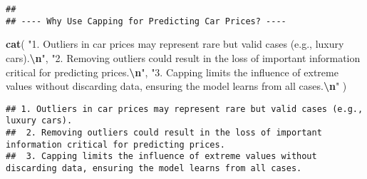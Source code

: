 \documentclass[
]{article}
\newenvironment{Shaded}{\begin{snugshade}}{\end{snugshade}}
\newcommand{\FunctionTok}[1]{\textcolor[rgb]{0.13,0.29,0.53}{\textbf{#1}}}
\newcommand{\NormalTok}[1]{#1}
\newcommand{\SpecialCharTok}[1]{\textcolor[rgb]{0.81,0.36,0.00}{\textbf{#1}}}
\newcommand{\StringTok}[1]{\textcolor[rgb]{0.31,0.60,0.02}{#1}}
\begin{document}
\begin{verbatim}
## 
## ---- Why Use Capping for Predicting Car Prices? ----
\end{verbatim}

\begin{Shaded}
\begin{Highlighting}[]
\FunctionTok{cat}\NormalTok{(}
  \StringTok{"1. Outliers in car prices may represent rare but valid cases (e.g., luxury cars).}\SpecialCharTok{\textbackslash{}n}\StringTok{"}\NormalTok{,}
  \StringTok{"2. Removing outliers could result in the loss of important information critical for predicting prices.}\SpecialCharTok{\textbackslash{}n}\StringTok{"}\NormalTok{,}
  \StringTok{"3. Capping limits the influence of extreme values without discarding data, ensuring the model learns from all cases.}\SpecialCharTok{\textbackslash{}n}\StringTok{"}
\NormalTok{)}
\end{Highlighting}
\end{Shaded}

\begin{verbatim}
## 1. Outliers in car prices may represent rare but valid cases (e.g., luxury cars).
##  2. Removing outliers could result in the loss of important information critical for predicting prices.
##  3. Capping limits the influence of extreme values without discarding data, ensuring the model learns from all cases.
\end{verbatim}
\end{document}
